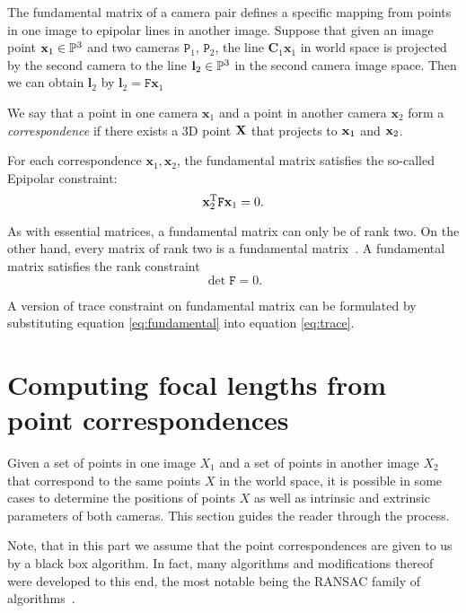The fundamental matrix of a camera pair defines a specific mapping from points in one image to epipolar lines in another image. Suppose that given an image point $\mathbf{x}_1 \in \mathbb{P}^3$ and two cameras $\mathtt{P}_1$, $\mathtt{P}_2$, the line $\mathbf{C}_1 \mathbf{x}_1$ in world space  is projected by the second camera to the line $\mathbf{l}_2 \in \mathbb{P}^3$ in the second camera image space. Then we can obtain $\mathbf{l}_2$ by $\mathbf{l}_2=\mathtt{F} \mathbf{x}_1$

\begin{defn}
We say that a point in one camera $\mathbf{x}_1$ and a point in another camera $\mathbf{x}_2$ form a \textit{correspondence} if there exists a 3D point $\mathbf{X}$ that projects to $\mathbf{x}_1$ and $\mathbf{x}_2$.
\end{defn}

For each correspondence $\mathbf{x}_1, \mathbf{x}_2$, the fundamental matrix satisfies the so-called Epipolar constraint:
\begin{equation}
\mathbf{x}_2^{\text{T}} \mathtt{F} \mathbf{x}_1 = 0.
\label{eq:epipolar}
\end{equation}

As with essential matrices, a fundamental matrix can only be of rank two. On the other hand, every matrix of rank two is a fundamental matrix~\cite{HartZiss}. A fundamental matrix satisfies the rank constraint
\begin{equation}
\det{\mathtt{F}} = 0.
\label{eq:rankF}
\end{equation}

A version of trace constraint on fundamental matrix can be formulated by substituting equation \ref{eq:fundamental} into equation \ref{eq:trace}.

\section{Computing focal lengths from point correspondences}
Given a set of points in one image $X_1$ and a set of points in another image $X_2$ that correspond to the same points $X$ in the world space, it is possible in some cases to determine the positions of points $X$ as well as intrinsic and extrinsic parameters of both cameras. This section guides the reader through the process.

Note, that in this part we assume that the point correspondences are given to us by a black box algorithm. In fact, many algorithms and modifications thereof were developed to this end, the most notable being the RANSAC family of algorithms~\cite{ransac}.


